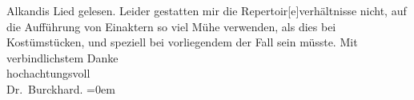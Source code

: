 \begin{ledgroupsized}[t]{13cm}
                  Alkandis Lied gelesen. Leider gestatten mir
               die Repertoir{[}e{]}verhältnisse nicht, auf die Aufführung von
               Einaktern so viel Mühe \label{T_L00024_1v}\label{T_L00024_1h}
               verwenden, als dies bei Kostümstücken, und speziell bei vorliegendem der Fall sein
               müsste.\pend
           \pstart
           Mit verbindlichstem Danke{\\[\baselineskip]}hochachtungsvoll{\\[\baselineskip]}\spacefill\mbox{Dr. Burckhard.}\pend
           \leftskip=0em{}
         
         \endnumbering{}\end{ledgroupsized}  \newcommand{\dateiname}{L00024}\newcommand{\titel}{Max Burckhard an Arthur Schnitzler, 14. 7. 1891}\newcommand{\editorInnen}{Martin Anton Müller und Gerd-Hermann Susen}
      